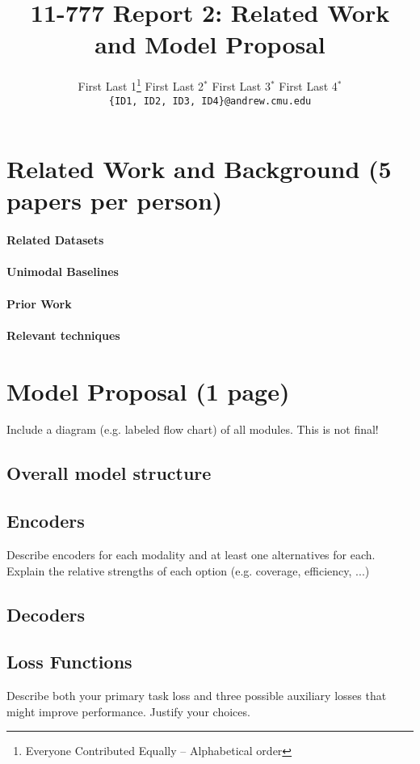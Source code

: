 \documentclass[11pt,a4paper]{article}
\title{11-777 Report 2: Related Work and Model Proposal}
\author{
  First Last 1\thanks{\hspace{4pt}Everyone Contributed Equally -- Alphabetical order} \hspace{2em} First Last 2$^*$ \hspace{2em} First Last 3$^*$ \hspace{2em} First Last 4$^*$ \\
  \texttt{\{ID1, ID2, ID3, ID4\}@andrew.cmu.edu}
  }
\date{}
\begin{document}
\maketitle
\section{Related Work and Background (5 papers per person)}
\paragraph{Related Datasets} 

\paragraph{Unimodal Baselines}

\paragraph{Prior Work}

\paragraph{Relevant techniques}


\clearpage
\section{Model Proposal (1 page)}
Include a diagram (e.g. labeled flow chart) of all modules.  This is not final!

\subsection{Overall model structure}

\subsection{Encoders}
Describe encoders for each modality and at least one alternatives for each.  Explain the relative strengths of each option (e.g. coverage, efficiency, ...)

\subsection{Decoders}

\subsection{Loss Functions}
Describe both your primary task loss and three possible auxiliary losses that might improve performance.  Justify your choices.
\end{document}

